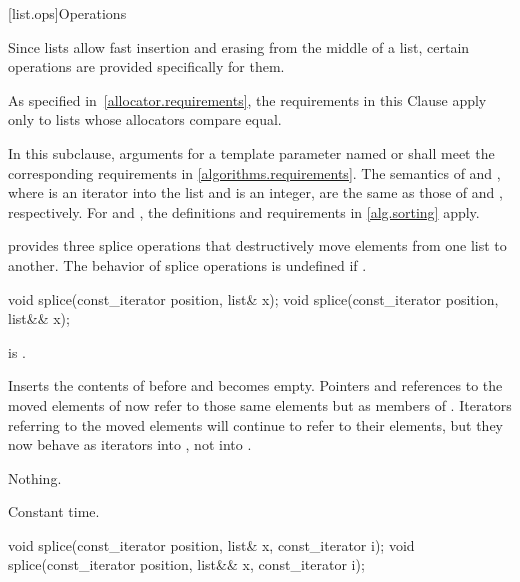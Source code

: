 [list.ops]{Operations}

\pnum
Since lists allow fast insertion and erasing from the middle of a list, certain
operations are provided specifically for them.
\begin{footnote}
As specified
in~\ref{allocator.requirements}, the requirements in this Clause apply only to
lists whose allocators compare equal.
\end{footnote}
In this subclause,
arguments for a template parameter
named  or 
shall meet the corresponding requirements in \ref{algorithms.requirements}.
The semantics of  and ,
where  is an iterator into the list and  is an integer,
are the same as those of  and ,
respectively.
For  and ,
the definitions and requirements in \ref{alg.sorting} apply.

\pnum
{} provides three splice operations that destructively move elements from one list to
another. The behavior of splice operations is undefined if .

%
\begin{itemdecl}
void splice(const_iterator position, list& x);
void splice(const_iterator position, list&& x);
\end{itemdecl}

\begin{itemdescr}
\pnum
\expects
{} is .

\pnum
\effects
Inserts the contents of
before
and
becomes empty.
Pointers and references to the moved elements of
now refer to those same elements but as members of
.
Iterators referring to the moved elements will continue to refer to their
elements, but they now behave as iterators into
,
not into
.

\pnum
\throws
Nothing.

\pnum
\complexity
Constant time.
\end{itemdescr}

%
\begin{itemdecl}
void splice(const_iterator position, list& x, const_iterator i);
void splice(const_iterator position, list&& x, const_iterator i);
\end{itemdecl}


